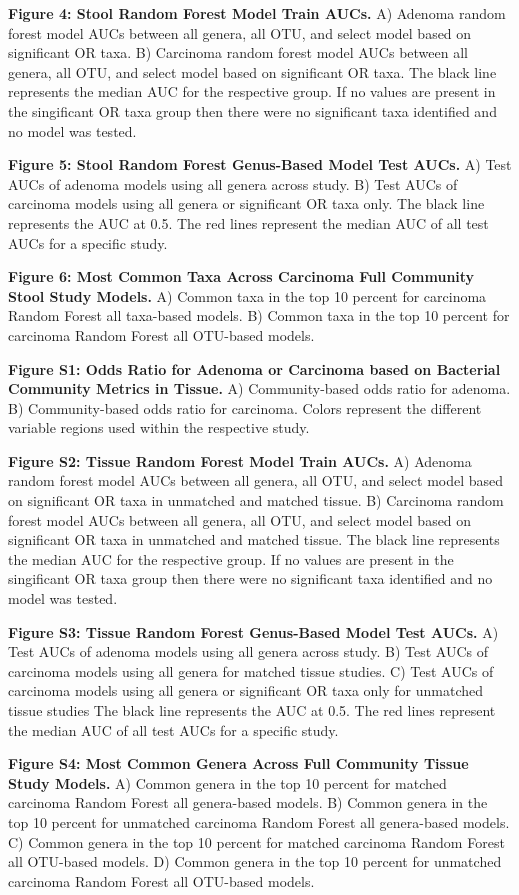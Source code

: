 \documentclass[12pt,]{article}
\begin{document}
\textbf{Figure 4: Stool Random Forest Model Train AUCs.} A) Adenoma
random forest model AUCs between all genera, all OTU, and select model
based on significant OR taxa. B) Carcinoma random forest model AUCs
between all genera, all OTU, and select model based on significant OR
taxa. The black line represents the median AUC for the respective group.
If no values are present in the singificant OR taxa group then there
were no significant taxa identified and no model was tested.

\textbf{Figure 5: Stool Random Forest Genus-Based Model Test AUCs.} A)
Test AUCs of adenoma models using all genera across study. B) Test AUCs
of carcinoma models using all genera or significant OR taxa only. The
black line represents the AUC at 0.5. The red lines represent the median
AUC of all test AUCs for a specific study.

\textbf{Figure 6: Most Common Taxa Across Carcinoma Full Community Stool
Study Models.} A) Common taxa in the top 10 percent for carcinoma Random
Forest all taxa-based models. B) Common taxa in the top 10 percent for
carcinoma Random Forest all OTU-based models.

\newpage

\textbf{Figure S1: Odds Ratio for Adenoma or Carcinoma based on
Bacterial Community Metrics in Tissue.} A) Community-based odds ratio
for adenoma. B) Community-based odds ratio for carcinoma. Colors
represent the different variable regions used within the respective
study.

\textbf{Figure S2: Tissue Random Forest Model Train AUCs.} A) Adenoma
random forest model AUCs between all genera, all OTU, and select model
based on significant OR taxa in unmatched and matched tissue. B)
Carcinoma random forest model AUCs between all genera, all OTU, and
select model based on significant OR taxa in unmatched and matched
tissue. The black line represents the median AUC for the respective
group. If no values are present in the singificant OR taxa group then
there were no significant taxa identified and no model was tested.

\textbf{Figure S3: Tissue Random Forest Genus-Based Model Test AUCs.} A)
Test AUCs of adenoma models using all genera across study. B) Test AUCs
of carcinoma models using all genera for matched tissue studies. C) Test
AUCs of carcinoma models using all genera or significant OR taxa only
for unmatched tissue studies The black line represents the AUC at 0.5.
The red lines represent the median AUC of all test AUCs for a specific
study.

\textbf{Figure S4: Most Common Genera Across Full Community Tissue Study
Models.} A) Common genera in the top 10 percent for matched carcinoma
Random Forest all genera-based models. B) Common genera in the top 10
percent for unmatched carcinoma Random Forest all genera-based models.
C) Common genera in the top 10 percent for matched carcinoma Random
Forest all OTU-based models. D) Common genera in the top 10 percent for
unmatched carcinoma Random Forest all OTU-based models.

\newpage
\end{document}
